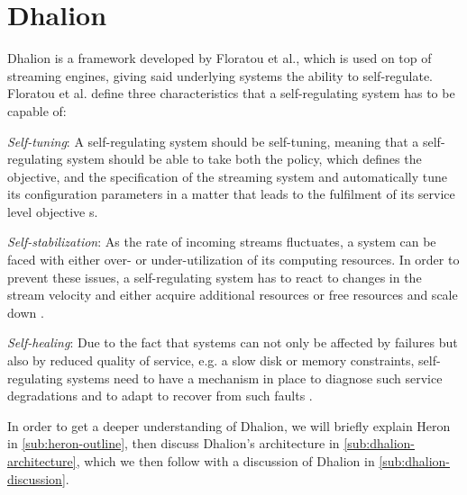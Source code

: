     \section{Dhalion}
    \label{sec:dhalion}
    Dhalion is a framework developed by Floratou et al., which is used on top of streaming engines, giving said underlying systems the ability to self-regulate.  
    Floratou et al. define three characteristics that a self-regulating system has to be capable of:
    
    \quad \textit{Self-tuning}: A self-regulating system should be self-tuning, meaning that a self-regulating system should 
    be able to take both the policy, which defines the objective, and the specification of the streaming system and automatically tune 
    its configuration parameters in a matter that leads to the fulfilment of its service level objective \cite{dhalion}s.
    
    \quad \textit{Self-stabilization}: As the rate of incoming streams fluctuates, a system can be faced with either over- or under-utilization of its computing resources. 
    In order to prevent these issues, a self-regulating system has to react to changes in the stream velocity and either acquire additional resources 
    or free resources and scale down \cite{dhalion}.

    \quad \textit{Self-healing}: Due to the fact that systems can not only be affected by failures but also by reduced quality of service, 
    e.g. a slow disk or memory constraints, self-regulating systems need to have a mechanism in place to diagnose such service degradations and to adapt 
    to recover from such faults \cite{dhalion}.

    In order to get a deeper understanding of Dhalion, we will briefly explain Heron in \ref{sub:heron-outline}, then discuss Dhalion's architecture in \ref{sub:dhalion-architecture}, 
    which we then follow with a discussion of Dhalion in \ref{sub:dhalion-discussion}.

